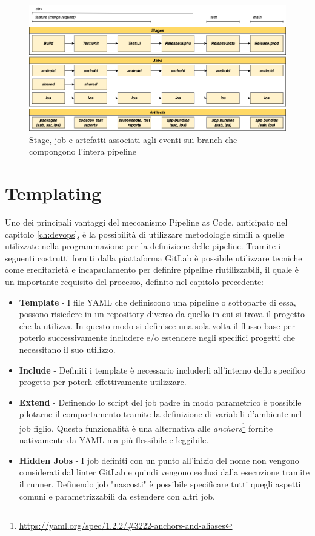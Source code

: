 \begin{figure}[H]
    \centering
    \includegraphics[width=1\textwidth]{img/cicd-branch-jobs.png}
    \caption{Stage, job e artefatti associati agli eventi sui branch che compongono l'intera pipeline}
    \label{pipeline-branches}
\end{figure}

\section{Templating}
Uno dei principali vantaggi del meccanismo Pipeline as Code, anticipato nel capitolo \ref{ch:devops}, è la possibilità di utilizzare metodologie simili a quelle utilizzate nella programmazione per la definizione delle pipeline. Tramite i seguenti costrutti forniti dalla piattaforma GitLab è possibile utilizzare tecniche come ereditarietà e incapsulamento per definire pipeline riutilizzabili, il quale è un importante requisito del processo, definito nel capitolo precedente:

\begin{itemize}
    \item \textbf{Template} - I file YAML che definiscono una pipeline o sottoparte di essa, possono risiedere in un repository diverso da quello in cui si trova il progetto che la utilizza. In questo modo si definisce una sola volta il flusso base per poterlo successivamente includere e/o estendere negli specifici progetti che necessitano il suo utilizzo.
    \item \textbf{Include} - Definiti i template è necessario includerli all'interno dello specifico progetto per poterli effettivamente utilizzare.
    \item \textbf{Extend} - Definendo lo script del job padre in modo parametrico è possibile pilotarne il comportamento tramite la definizione di variabili d'ambiente nel job figlio. Questa funzionalità è una alternativa alle \textit{anchors}\footnote{\href{https://yaml.org/spec/1.2.2/\#3222-anchors-and-aliases}{https://yaml.org/spec/1.2.2/\#3222-anchors-and-aliases}} fornite nativamente da YAML ma più flessibile e leggibile.
    \item \textbf{Hidden Jobs} - I job definiti con un punto all'inizio del nome non vengono considerati dal linter GitLab e quindi vengono esclusi dalla esecuzione tramite il runner. Definendo job "nascosti" è possibile specificare tutti quegli aspetti comuni e parametrizzabili da estendere con altri job.
\end{itemize}

